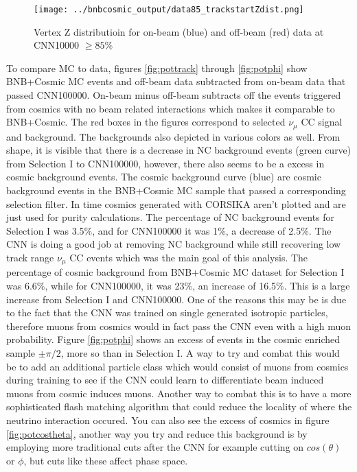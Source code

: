 \begin{figure}[htp!]
\centering
\texttt{[image: ../bnbcosmic\_output/data85\_trackstartZdist.png]}
\caption{Vertex Z distributioin for on-beam (blue) and off-beam (red) data at CNN10000 $\geq 85\%$} 
\label{fig:dataZ}
\end{figure}

To compare MC to data, figures \ref{fig:pottrack} through \ref{fig:potphi} show BNB+Cosmic MC events and off-beam data subtracted from on-beam data that passed CNN100000. On-beam minus off-beam subtracts off the events triggered from cosmics with no beam related interactions which makes it comparable to BNB+Cosmic. The red boxes in the figures correspond to selected $\nu_{\mu}$ CC signal and background. The backgrounds also depicted in various colors as well. From shape, it is visible that there is a decrease in NC background events (green curve) from Selection I to CNN100000, however, there also seems to be a excess in cosmic background events. The cosmic background curve (blue) are cosmic background events in the BNB+Cosmic MC sample that passed a corresponding selection filter. In time cosmics generated with CORSIKA aren't plotted and are just used for purity calculations. The percentage of NC background events for Selection I was 3.5\%, and for CNN100000 it was 1\%, a decrease of 2.5\%. The CNN is doing a good job at removing NC background while still recovering low track range $\nu_{\mu}$ CC events which was the main goal of this analysis. The percentage of cosmic background from BNB+Cosmic MC dataset for Selection I was 6.6\%, while for CNN100000, it was 23\%, an increase of 16.5\%. This is a large increase from Selection I and CNN100000. One of the reasons this may be is due to the fact that the CNN was trained on single generated isotropic particles, therefore muons from cosmics would in fact pass the CNN even with a high muon probability. Figure \ref{fig:potphi} shows an excess of events in the cosmic enriched sample $\pm\pi/2$, more so than in Selection I. A way to try and combat this would be to add an additional particle class which would consist of muons from cosmics during training to see if the CNN could learn to differentiate beam induced muons from cosmic induces muons. Another way to combat this is to have a more sophisticated flash matching algorithm that could reduce the locality of where the neutrino interaction occured. You can also see the excess of cosmics in figure \ref{fig:potcostheta}, another way you try and reduce this background is by employing more traditional cuts after the CNN for example cutting on $cos(\theta)$ or $\phi$, but cuts like these affect phase space. 


